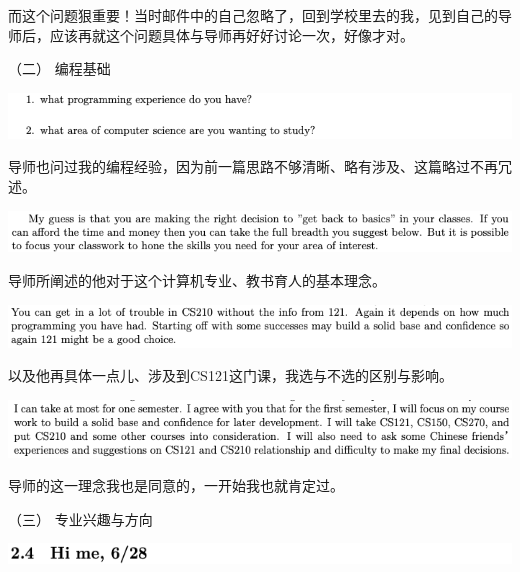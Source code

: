 \documentclass[9pt, b5paper]{article}
\begin{document}
而这个问题狠重要！当时邮件中的自己忽略了，回到学校里去的我，见到自己的导师后，应该再就这个问题具体与导师再好好讨论一次，好像才对。

（二） 编程基础

\begin{center}
\includegraphics[width=.9\linewidth]{./pic/backups_plans_20210421_130001.png}
\end{center}

导师也问过我的编程经验，因为前一篇思路不够清晰、略有涉及、这篇略过不再冗述。

\begin{center}
\includegraphics[width=.9\linewidth]{./pic/backups_plans_20210421_125854.png}
\end{center}

导师所阐述的他对于这个计算机专业、教书育人的基本理念。

\begin{center}
\includegraphics[width=.9\linewidth]{./pic/backups_plans_20210421_125909.png}
\end{center}

以及他再具体一点儿、涉及到CS121这门课，我选与不选的区别与影响。

\begin{center}
\includegraphics[width=.9\linewidth]{./pic/backups_plans_20210419_085149.png}
\end{center}

导师的这一理念我也是同意的，一开始我也就肯定过。

（三） 专业兴趣与方向

\begin{center}
\includegraphics[width=.9\linewidth]{./pic/backups_plans_20210421_090244.png}
\end{center}
\end{document}
